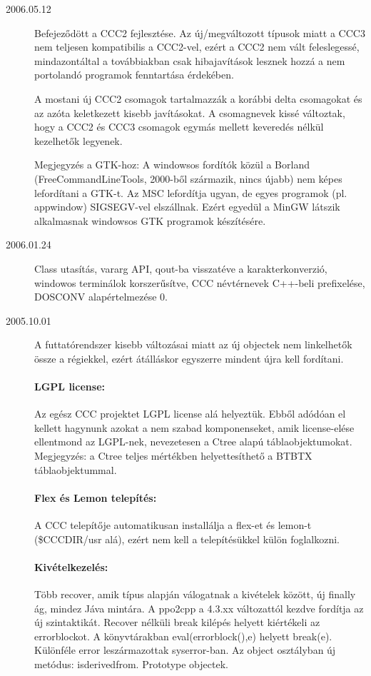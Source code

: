\begin{description}
\label{20060512}
\item[2006.05.12]

  Befejeződött a CCC2 fejlesztése.
  Az új/megváltozott típusok miatt a CCC3 nem teljesen 
  kompatibilis a CCC2-vel, ezért a CCC2 nem vált feleslegessé,
  mindazontáltal a továbbiakban csak hibajavítások lesznek hozzá
  a nem portolandó programok fenntartása érdekében.

  A mostani új CCC2 csomagok tartalmazzák a korábbi delta csomagokat
  és az azóta keletkezett kisebb javításokat. A csomagnevek
  kissé változtak, hogy a CCC2 és CCC3  csomagok egymás mellett
  keveredés nélkül kezelhetők legyenek.

  Megjegyzés a GTK-hoz: A windowsos fordítók közül a Borland
  (FreeCommandLineTools, 2000-ből származik, nincs újabb) nem képes 
  lefordítani a GTK-t. Az MSC lefordítja ugyan, de egyes programok 
  (pl. appwindow) SIGSEGV-vel elszállnak. Ezért egyedül a MinGW 
  látszik alkalmasnak windowsos GTK programok készítésére.

\label{20060124}
\item[2006.01.24]
  Class utasítás, 
  vararg API, 
  qout-ba visszatéve a karakterkonverzió,
  windowos terminálok korszerűsítve, 
  CCC névtérnevek C++-beli prefixelése,
  DOSCONV alapértelmezése 0.

\label{20051001}
\item[2005.10.01]
  A futtatórendszer kisebb változásai miatt 
  az új objectek nem linkelhetők össze a régiekkel, 
  ezért átálláskor egyszerre mindent újra kell fordítani.

  \paragraph{LGPL license:}\label{LGPL}
    Az egész CCC projektet LGPL license alá helyeztük.
    Ebből adódóan el kellett hagynunk azokat a nem szabad 
    komponenseket,  amik license-elése ellentmond az LGPL-nek,
    nevezetesen a Ctree alapú táblaobjektumokat. Megjegyzés:
    a Ctree teljes mértékben helyettesíthető a BTBTX táblaobjektummal.
  
  \paragraph{Flex és Lemon telepítés:}\label{FLEX}
    A CCC telepítője automatikusan installálja a flex-et és lemon-t
    (\$CCCDIR/usr alá), ezért nem kell a telepítésükkel külön  foglalkozni.

  \paragraph{Kivételkezelés:}\label{EXCEPTION}
    Több recover, amik típus alapján
    válogatnak a kivételek között, új finally ág, mindez Jáva mintára.
    A ppo2cpp a 4.3.xx változattól kezdve fordítja az új szintaktikát.
    Recover nélküli break kilépés helyett kiértékeli az errorblockot.
    A könyvtárakban eval(errorblock(),e) helyett break(e).
    Különféle error leszármazottak syserror-ban.
    Az object osztályban új metódus: isderivedfrom.
    Prototype objectek.


\end{description}
